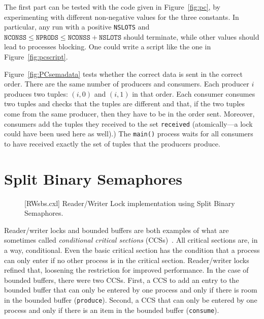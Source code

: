\documentclass{report}
\newenvironment{code}{
\tcolorbox
}{
\endtcolorbox
}
\begin{document}
The first part can be tested with the code given in Figure~\ref{fig:pc}, by
experimenting with different non-negative values for the three constants.
In particular, any run with a positive \texttt{NSLOTS} and
$\mathtt{NCONSS} \le \mathtt{NPRODS} \le \mathtt{NCONSS} + \mathtt{NSLOTS}$
should terminate, while other values should lead to processes blocking.
One could write a script like the one in Figure~\ref{fig:pcscript}.

Figure~\ref{fig:PCsemadata} tests whether the correct data is sent in
the correct order.  There are the same number of producers and consumers.
Each producer $i$ produces two tuples: $(i, 0)$ and $(i, 1)$ in that order.
Each consumer consumes two tuples and checks that the tuples are different
and that, if the two tuples come from the same producer, then they have to
be in the order sent.
Moreover, consumers add the tuples they received to the set
\texttt{received} (atomically---a lock could have been used here as well).)
The \texttt{main()} process waits for all consumers to have received
exactly the set of tuples that the producers produce.

\chapter{Split Binary Semaphores}
\label{ch:sbs}

\begin{figure}
\begin{code}
\end{code}
\caption{[RWsbs.cxl] Reader/Writer Lock implementation using Split Binary Semaphores.}
\label{fig:RWsplitsema}
\end{figure}

Reader/writer locks and bounded buffers are both examples of what are
sometimes called \emph{conditional critical sections}
(CCSs)~\cite{Hoare73}.
All critical sections are, in a way, conditional.  Even the basic critical section
has the condition that a process can only enter if no other process
is in the critical section.  Reader/writer locks refined that, loosening
the restriction for improved performance.
In the case of bounded buffers, there were two CCSs.  First, a CCS
to add an entry to the bounded buffer that can only be entered by one
process and only if there is room in the bounded buffer (\texttt{produce}).
Second, a CCS that can only be entered by one process and
only if there is an item in the bounded buffer (\texttt{consume}).
\end{document}
